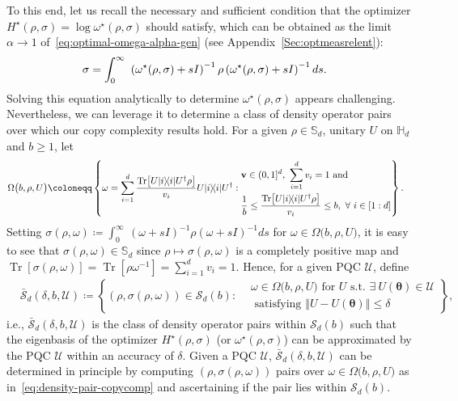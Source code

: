 \documentclass[a4paper,onecolumn,11pt,accepted=2026-05-12]{quantumarticle}
\newcommand{\norm}[1]{\left\Vert#1\right\Vert}
\newcommand{\cS}{\mathcal{S}}
\newcommand{\cU}{\mathcal{U}}
\newcommand{\HH}{\mathbb{H}}
\begin{document}
To this end, let us recall the necessary and sufficient condition that the optimizer $H^{\star}(\rho,\sigma)= \log \omega^{\star}(\rho,\sigma)$ should satisfy, which can be obtained as the limit $\alpha \to 1$ of~\eqref{eq:optimal-omega-alpha-gen} (see Appendix~\ref{Sec:optmeasrelent}):
\begin{align}
\sigma & =\int_{0}^{\infty}\ \left(\omega^{\star}(\rho,\sigma)+sI\right)^{-1}\rho\left(\omega^{\star}(\rho,\sigma)+sI\right)^{-1}ds. \notag
\end{align}
Solving this equation analytically to determine $\omega^{\star}(\rho,\sigma)$ appears challenging. Nevertheless, we can leverage it to determine a  class of density operator pairs over which our copy complexity results hold.   For a given $\rho \in \mathbb{S}_d$,  unitary $U$ on $\HH_d$ and $b \geq 1$, let 
\begin{align}
\Omega\big(b,\rho, U\big) &\coloneqq \left\{ \omega =\sum_{i=1}^d\frac{\operatorname{Tr}\!\left[ U |i\rangle\!\langle
i|U^{\dag}\rho\right]}{v_i} U |i\rangle\!\langle
i|U^{\dag} : \begin{aligned}
   & \mathbf{v} \in (0,1]^d, ~\sum_{i=1}^d v_i=1 \mbox{ and } \\& \frac{1}{b} \leq \frac{\operatorname{Tr}\!\left[ U |i\rangle\!\langle
i|U^{\dag}\rho\right]}{v_i} \leq b, ~\forall~i \in [1:d]
\end{aligned}\right\}. \notag
\end{align}
Setting $\sigma(\rho, \omega) \coloneqq \int_{0}^{\infty}\ \left(\omega+sI\right)^{-1}\rho\left(\omega+sI\right)^{-1}ds$ for $\omega \in \Omega\big(b,\rho, U\big)$, it is easy to see that $\sigma(\rho, \omega) \in \mathbb{S}_d$ since $\rho \mapsto \sigma(\rho, \omega)$ is a completely positive map and $\operatorname{Tr}\!\left[\sigma(\rho, \omega)\right]= \operatorname{Tr}\!\left[\rho \omega^{-1}\right]=\sum_{i=1}^d v_i=1$. 
Hence, for a given PQC $\cU$, define 
\begin{align}
 & \bar{\cS}_d(\delta, b,\cU) \coloneqq \left\{(\rho,\sigma(\rho,\omega)) \in \cS_d(b): \begin{aligned}
     &  \omega \in \Omega\big(b,\rho, U\big) \mbox{ for }  U \mbox{ s.t. } \exists~ U(\bm{\theta}) \in \cU\\
     &  \mbox{ satisfying } \norm{U-U(\bm{\theta})} \leq \delta
 \end{aligned}  \right\}, \label{eq:density-pair-copycomp} 
\end{align}
i.e., $\bar{\cS}_d(\delta, b,\cU)$ is the class of density operator pairs within $\cS_d(b)$ such that the eigenbasis of the optimizer $H^{\star}(\rho,\sigma)$ (or $\omega^{\star}(\rho,\sigma)$) can be approximated by the PQC $\cU$ within an accuracy of $\delta$.  Given a PQC $\cU$, $\bar{\cS}_d(\delta, b,\cU)$ can be determined in principle by computing  $(\rho,\sigma(\rho,\omega))$ pairs over $\omega \in \Omega\big(b,\rho, U\big)$ as in~\eqref{eq:density-pair-copycomp} and ascertaining if the pair lies within $ \cS_d(b)$. 
\end{document}
